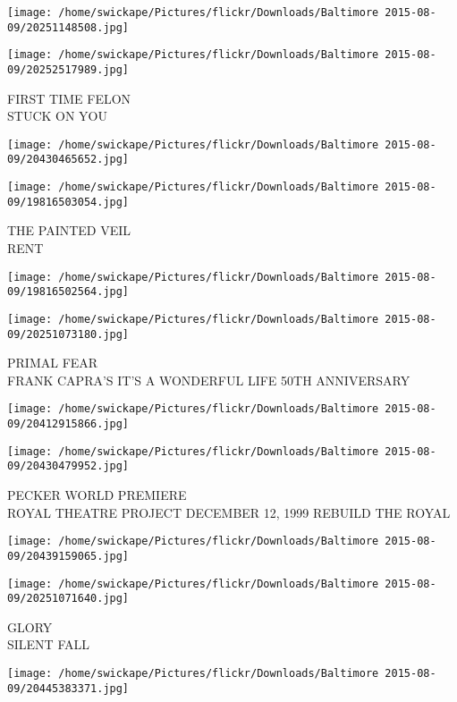 \documentclass[10pt,letterpaper]{article}
\begin{document}
\texttt{[image: /home/swickape/Pictures/flickr/Downloads/Baltimore 2015-08-09/20251148508.jpg]}

\vspace{0.25in}
\texttt{[image: /home/swickape/Pictures/flickr/Downloads/Baltimore 2015-08-09/20252517989.jpg]}

FIRST TIME FELON\\
STUCK ON YOU
\pagebreak

\texttt{[image: /home/swickape/Pictures/flickr/Downloads/Baltimore 2015-08-09/20430465652.jpg]}

\vspace{0.25in}
\texttt{[image: /home/swickape/Pictures/flickr/Downloads/Baltimore 2015-08-09/19816503054.jpg]}

THE PAINTED VEIL\\
RENT
\pagebreak

\texttt{[image: /home/swickape/Pictures/flickr/Downloads/Baltimore 2015-08-09/19816502564.jpg]}

\vspace{0.25in}
\texttt{[image: /home/swickape/Pictures/flickr/Downloads/Baltimore 2015-08-09/20251073180.jpg]}

PRIMAL FEAR\\
FRANK CAPRA'S IT'S A WONDERFUL LIFE 50TH ANNIVERSARY
\pagebreak

\texttt{[image: /home/swickape/Pictures/flickr/Downloads/Baltimore 2015-08-09/20412915866.jpg]}

\vspace{0.25in}
\texttt{[image: /home/swickape/Pictures/flickr/Downloads/Baltimore 2015-08-09/20430479952.jpg]}

PECKER WORLD PREMIERE\\
ROYAL THEATRE PROJECT DECEMBER 12, 1999 REBUILD THE ROYAL
\pagebreak

\texttt{[image: /home/swickape/Pictures/flickr/Downloads/Baltimore 2015-08-09/20439159065.jpg]}

\vspace{0.25in}
\texttt{[image: /home/swickape/Pictures/flickr/Downloads/Baltimore 2015-08-09/20251071640.jpg]}

GLORY\\
SILENT FALL
\pagebreak

\texttt{[image: /home/swickape/Pictures/flickr/Downloads/Baltimore 2015-08-09/20445383371.jpg]}
\end{document}

